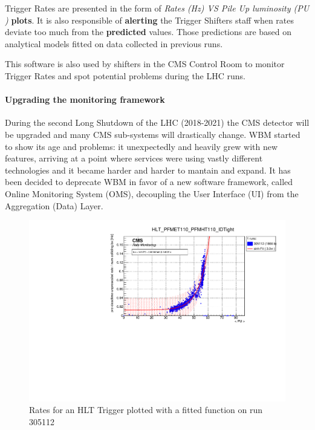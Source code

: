 \documentclass[a4, oneside, 11pt, nobib]{memoir}
\begin{document}
		Trigger Rates are presented in the form of \textit{Rates (Hz) VS Pile Up luminosity (PU \cite{Herr:941318})} \textbf{plots}.  It is also responsible of \textbf{alerting} the Trigger Shifters staff when rates deviate too much from the \textbf{predicted} values. Those predictions are based on analytical models fitted on data collected in previous runs.

		This software is also used by shifters in the CMS Control Room to monitor Trigger Rates and spot potential problems during the LHC runs.


		\paragraph{Upgrading the monitoring framework} 

		During the second Long Shutdown of the LHC (2018-2021) the CMS detector will be upgraded and many CMS sub-systems will drastically change. WBM started to show its age and problems: it unexpectedly and heavily grew with new features, arriving at a point where services were using vastly different technologies and it became harder and harder to mantain and expand. It has been decided to deprecate WBM in favor of a new software framework, called Online Monitoring System (OMS), decoupling the User Interface (UI) from the Aggregation (Data) Layer.

\begin{figure}[H]
    \centerline{
        \includegraphics[width=0.6\paperwidth]{figures/RMT_305112_HLT_PFMET110_PFMHT110_IDTight.pdf}}
    \caption{Rates for an HLT Trigger plotted with a fitted function on run 305112}
    \label{fig:ratemon_hlt}
\end{figure}
\end{document}
